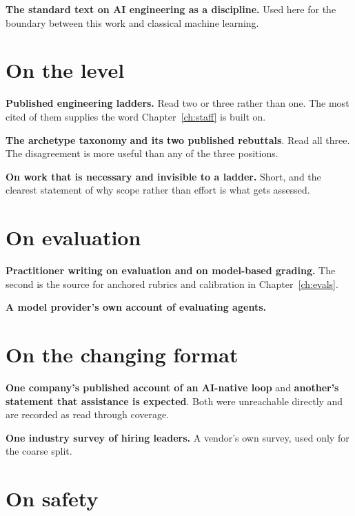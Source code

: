 \textbf{The standard text on AI engineering as a
discipline.} Used here for the boundary between this work
and classical machine learning.

\section{On the level}

\textbf{Published engineering ladders.} Read two or
three rather than one. The most cited of them supplies the
word Chapter~\ref{ch:staff} is built on.

\textbf{The archetype taxonomy} \textbf{and its two
published rebuttals}.
Read all three. The disagreement is more useful than any of the three
positions.

\textbf{On work that is necessary and invisible to a ladder.}
Short, and the clearest statement of why scope rather than effort is what gets
assessed.

\section{On evaluation}

\textbf{Practitioner writing on evaluation and on model-based
grading.} The second is the
source for anchored rubrics and calibration in Chapter~\ref{ch:evals}.

\textbf{A model provider's own account of evaluating
agents.}

\section{On the changing format}

\textbf{One company's published account of an AI-native
loop} and \textbf{another's statement that
assistance is expected}. Both were unreachable
directly and are recorded as read through coverage.

\textbf{One industry survey of hiring leaders.} A
vendor's own survey, used only for the coarse split.

\section{On safety}


